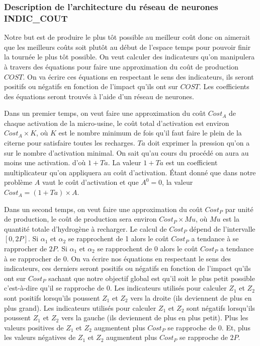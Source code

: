 \subsubsection{Description de l'architecture du réseau de neurones \textbf{INDIC\_COUT}}
Notre but est de produire le plus tôt possible au meilleur coût donc on aimerait que les meilleurs coûts soit plutôt au début de l'espace temps pour pouvoir finir la tournée le plus tôt possible.
On veut calculer des indicateurs qu'on manipulera à travers des équations pour faire une approximation du coût de production $COST$.
 On va écrire ces équations en respectant le sens des indicateurs, ils seront positifs ou négatifs en fonction de l'impact qu'ils ont sur $COST$. Les coefficients des équations seront trouvés à l'aide d'un réseau de neurones.
 
 Dans un premier temps, on veut faire une approximation du coût $Cost_A$  de chaque activation de la micro-usine, le coût total d'activation est environ $Cost_A\times K$, où $K$ est le nombre minimum de fois qu'il faut faire le plein de la citerne pour satisfaire toutes les recharges. $Ta$ doit exprimer la pression qu'on a sur le nombre d'activation minimal. On sait qu'au cours du procédé on aura au moins une activation. d'où $1+Ta$. La valeur $1+Ta$ est un coefficient multiplicateur qu'on appliquera au coût d'activation. 
  Étant donné que  dans notre problème $A$ vaut le coût d'activation et que $A^0=0$, la valeur $Cost_A = (1 + Ta)\times A$.
  
  Dans un second temps, on veut faire une approximation du coût $Cost_P$ par unité de production, le coût de production sera environ $Cost_P\times Mu$, où $Mu$ est la quantité totale d'hydrogène à recharger.
  Le calcul de $Cost_P$ dépend de l'intervalle $[0,2P]$. Si $\alpha_1$ et $\alpha_2$ se rapprochent de 1 alors le coût $Cost_P$ a tendance à se rapprocher de $2P$. Si $\alpha_1$ et $\alpha_2$ se rapprochent de $0$ alors le coût $Cost_P$ a tendance à se rapprocher de 0. On va écrire nos équations en respectant le sens des indicateurs, ces derniers seront positifs ou négatifs en fonction de l'impact qu'ils ont sur $Cost_P$ sachant que notre objectif global est qu'il soit le plus petit possible c'est-à-dire qu'il se rapproche de $0$. Les indicateurs utilisés pour calculer $Z_1$ et $Z_2$ sont positifs lorsqu'ils poussent $Z_1$ et $Z_2$ vers la droite (ils deviennent de plus en plus grand). Les indicateurs utilisés pour calculer $Z_1$ et $Z_2$ sont négatifs lorsqu'ils poussent $Z_1$ et $Z_2$ vers la gauche (ils deviennent de plus en plus petit). Plus les valeurs positives de $Z_1$ et $Z_2$ augmentent plus $Cost_P$ se rapproche de 0. Et, plus les valeurs négatives de $Z_1$ et $Z_2$ augmentent plus $Cost_P$ se rapproche de $2P$.
 
